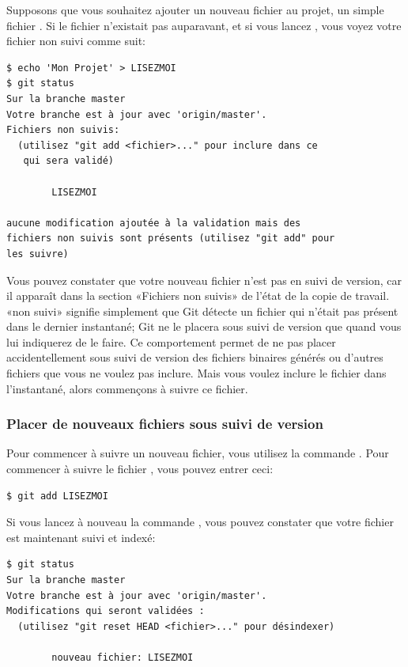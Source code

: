 Supposons que vous souhaitez ajouter un nouveau fichier au projet, un simple fichier .
Si le fichier n'existait pas auparavant, et si vous lancez , vous voyez votre fichier non suivi comme suit:
\begin{Schunk}
\begin{Verbatim}
$ echo 'Mon Projet' > LISEZMOI
$ git status
Sur la branche master
Votre branche est à jour avec 'origin/master'.
Fichiers non suivis:
  (utilisez "git add <fichier>..." pour inclure dans ce
   qui sera validé)

        LISEZMOI

aucune modification ajoutée à la validation mais des
fichiers non suivis sont présents (utilisez "git add" pour
les suivre)
\end{Verbatim}
\end{Schunk}

Vous pouvez constater que votre nouveau fichier  n'est pas en suivi de version, car il apparaît dans la section «Fichiers non suivis» de l'état de la copie de travail.
«non suivi» signifie simplement que Git détecte un fichier qui n'était pas présent dans le dernier instantané; Git ne le placera sous suivi de version que quand vous lui indiquerez de le faire.
Ce comportement permet de ne pas placer accidentellement sous suivi de version des fichiers binaires générés ou d'autres fichiers que vous ne voulez pas inclure.
Mais vous voulez inclure le fichier  dans l'instantané, alors commençons à suivre ce fichier.

\subsubsection{Placer de nouveaux fichiers sous suivi de version}
\label{sec:git:tracking_files}

Pour commencer à suivre un nouveau fichier, vous utilisez la commande .
Pour commencer à suivre le fichier , vous pouvez entrer ceci:
\begin{Schunk}
\begin{Verbatim}
$ git add LISEZMOI
\end{Verbatim}
\end{Schunk}

Si vous lancez à nouveau la commande , vous pouvez constater que votre fichier  est maintenant suivi et indexé:
\begin{Schunk}
\begin{Verbatim}
$ git status
Sur la branche master
Votre branche est à jour avec 'origin/master'.
Modifications qui seront validées :
  (utilisez "git reset HEAD <fichier>..." pour désindexer)

        nouveau fichier: LISEZMOI
\end{Verbatim}
\end{Schunk}

